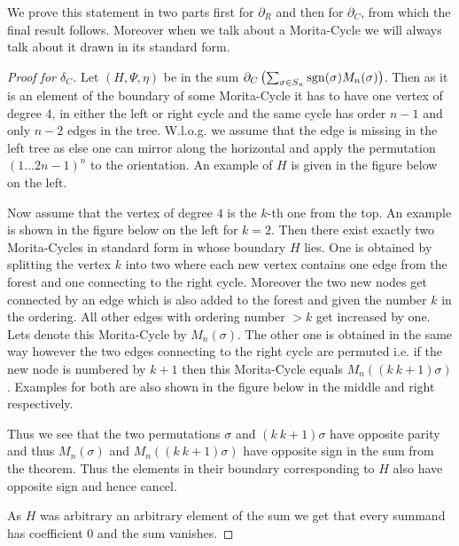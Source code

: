 We prove this statement in two parts first for $\partial_{R}$ and then for $\partial_{C}$, from which the final result follows.
Moreover when we talk about a Morita-Cycle we will always talk about it drawn in its standard form.
\begin{proof}[Proof for $\delta_C$]
	Let $(H,\Psi,\eta)$ be in the sum $\partial_{C}\left(\sum_{\sigma \in S_{n}} \operatorname{sgn}(\sigma) M_{n}(\sigma)\right)$.
	Then as it is an element of the boundary of some Morita-Cycle it has to
	have one vertex of degree 4, in either the left or right cycle and the same cycle has order $n-1$ and only $n-2$ edges in the tree.
	W.l.o.g. we assume that the edge is missing in the left tree as else one can mirror along the horizontal
	and apply the permutation $(1 \ldots 2n-1)^{n}$ to the orientation. An example of $H$ is given in the figure below on the left.

	Now assume that the vertex of degree $4$ is the $k$-th one from the top. An example is shown in the figure below on the left for $k = 2$.
	Then there exist exactly two Morita-Cycles in standard form in whose boundary $H$ lies. 
	One is obtained by splitting the vertex $k$ into two where each new vertex contains one edge from the forest and one connecting to the right cycle.
	Moreover the two new nodes get connected by an edge which is also added to the forest and given the number $k$ in the ordering.
	All other edges with ordering number  $> k $ get increased by one. Lets denote this Morita-Cycle by $M_{n}(\sigma)$.
	The other one is obtained in the same way however the two edges connecting to the right cycle are permuted i.e.
	if the new node is numbered by $k+1$ then this Morita-Cycle equals $M_{n}((k\ k+1)\sigma)$.
	Examples for both are also shown in the figure below in the middle and right respectively.

	Thus we see that the two permutations $\sigma$ and $(k\ k+1) \sigma$ have opposite parity and thus $M_{n}(\sigma)$ and $M_{n}((k\ k+1) \sigma)$ have
	opposite sign in the sum from the theorem. Thus the elements in their boundary corresponding to $H$ also have opposite sign and hence cancel.

	As $H$ was arbitrary an arbitrary element of the sum we get that every summand has coefficient $0$ and the sum vanishes.
\end{proof}

